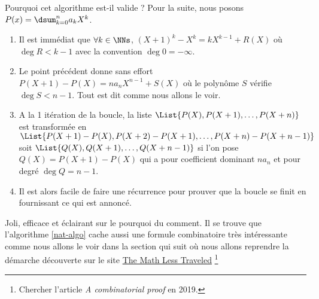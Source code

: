 Pourquoi cet algorithme est-il valide ? Pour la suite, nous posons $P(x) = \dsum_{k=0}^{n} a_k X^k$.

\begin{enumerate}
	\item Il est immédiat que $\forall k \in \NNs$, $(X+1)^k - X^k = kX^{k-1} + R(X)$ où $\deg R < k-1$ avec la convention $\deg 0 = - \infty$.


	\item Le point précédent donne sans effort $P(X+1) - P(X) = n a_n X^{n-1} + S(X)$ où le polynôme $S$ vérifie $\deg S < n-1$. Tout est dit comme nous allons le voir.


	\item A la 1\iere{} itération de la boucle, la liste 
			  $\List{P(X) , P(X+1) , \dots , P(X+n)}$
	 	  est transformée en 
		      $\List{P(X+1) - P(X) , P(X+2) - P(X+1) , \dots , P(X+n) - P(X+n-1)}$
		  soit $\List{Q(X) , Q(X+1) , \dots , Q(X+n-1)}$ si l'on pose $Q(X) = P(X+1) - P(X)$ qui a pour coefficient dominant $n a_n$ et pour degré $\deg Q = n - 1$.


	\item Il est alors facile de faire une récurrence pour prouver que la boucle se finit en fournissant ce qui est annoncé.  
\end{enumerate}

Joli, efficace et éclairant sur le pourquoi du comment. Il se trouve que l'algorithme \ref{nat-algo} cache aussi une formule combinatoire très intéressante comme nous allons le voir dans la section qui suit où nous allons reprendre la démarche découverte sur le site \href{https://mathlesstraveled.com}{The Math Less Traveled}
\footnote{
	Chercher l'article \emph{\og A combinatorial proof \fg} en 2019.
} 
